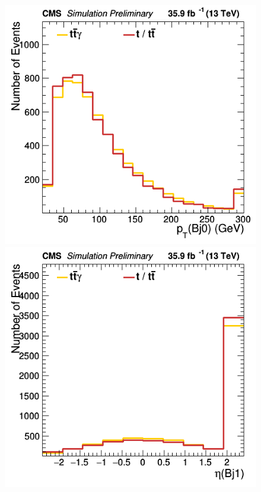 \documentclass[11pt]{scrartcl}
\begin{document}
	\begin{figure}[H]
	\centering
	\begin{minipage}{.5\textwidth}
	  \centering
	  \includegraphics[width=0.7\linewidth]{figures/Notused/Bj0_pt.png}
	\end{minipage}%
	\begin{minipage}{.5\textwidth}
	  \centering
	  \includegraphics[width=0.7\linewidth]{figures/Notused/Bj1_eta.png}
	\end{minipage}
	\end{figure}
	
\end{document}
